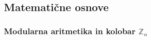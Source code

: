 \documentclass[a4paper, 12pt]{article} %
\newcommand{\Zn}{\mathbb{Z}_n}
\begin{document}
\subsection{Matematične osnove}

\subsubsection{Modularna aritmetika in kolobar $\Zn$}
\end{document}
